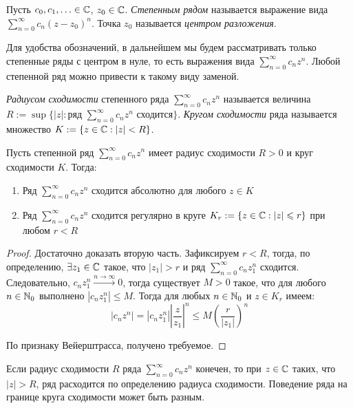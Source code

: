 \begin{definition}
	Пусть $c_0, c_1, \dotsc \in \mathbb{C}$, $z_0 \in \mathbb{C}$. \textit{Степенным рядом} называется выражение вида $\sum_{n=0}^\infty c_n(z - z_0)^n$. Точка $z_0$ называется \textit{центром разложения}.
\end{definition}

\begin{note}
	Для удобства обозначений, в дальнейшем мы будем рассматривать только степенные ряды с центром в нуле, то есть выражения вида $\sum_{n=0}^\infty c_nz^n$. Любой степенной ряд можно привести к такому виду заменой.
\end{note}

\pagebreak

\begin{definition}
	\textit{Радиусом сходимости} степенного ряда $\sum_{n=0}^\infty c_nz^n$ называется величина $R := \sup\{|z| : \text{ряд }\sum_{n=0}^\infty c_nz^n\text{ сходится}\}$. \textit{Кругом сходимости} ряда называется множество $K := \{z \in \mathbb{C} : |z| < R\}$.
\end{definition}

\begin{theorem}[Абеля]
	Пусть степенной ряд $\sum_{n=0}^\infty c_nz^n$ имеет радиус сходимости $R > 0$ и круг сходимости $K$. Тогда:
	\begin{enumerate}
		\item Ряд $\sum_{n=0}^\infty c_nz^n$ сходится абсолютно для любого $z \in K$
		\item Ряд $\sum_{n=0}^\infty c_nz^n$ сходится регулярно в круге $K_r := \{z \in \mathbb{C}: |z| \leqslant r\}$ при любом $r < R$
	\end{enumerate}
\end{theorem}

\begin{proof}
	Достаточно доказать вторую часть. Зафиксируем $r < R$, тогда, по определению, $\exists z_1 \in \mathbb{C}$ такое, что $|z_1| > r$ и ряд $\sum_{n=0}^\infty c_nz_1^n$ сходится. Следовательно, $c_nz_1^n \xrightarrow{n \to \infty} 0$, тогда существует $M > 0$ такое, что для любого $n \in \mathbb{N}_0$ выполнено $|c_nz_1^n| \le M$. Тогда для любых $n \in \mathbb{N}_0$ и $z \in K_r$ имеем:
	\[|c_nz^n| = \left|c_nz_1^n\right|\left|\frac{z}{z_1}\right|^n \le M\left(\frac{r}{|z_1|}\right)^n\]
	
	По признаку Вейерштрасса, получено требуемое.
\end{proof}

\begin{note}
	Если радиус сходимости $R$ ряда $\sum_{n=0}^\infty c_nz^n$ конечен, то при $z \in \mathbb{C}$ таких, что $|z| > R$, ряд расходится по определению радиуса сходимости. Поведение ряда на границе круга сходимости может быть разным.
\end{note}

